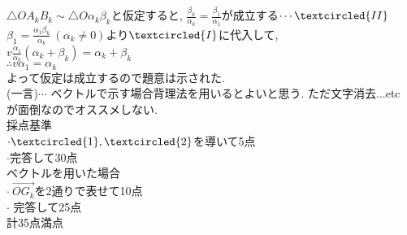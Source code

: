 \documentclass{article}
\begin{document}
$\triangle{OA_kB_k} \sim \triangle{O\alpha_k\beta_k}$と仮定すると,
$\frac{\beta_k}{\alpha_k}=\frac{\beta_1}{\alpha_1}$が成立する$\cdots \textcircled{II}$\vspace{0.1in}\\
$\beta_1=\frac{\alpha_1\beta_k}{\alpha_k}\ (\alpha_k\neq0)$より$\textcircled{I}$に代入して,\vspace{0.1in}\\
$v\frac{\alpha_1}{\alpha_k}(\alpha_k+\beta_k)=\alpha_k+\beta_k$\vspace{0.1in}\\
$\therefore v\alpha_1=\alpha_k$\vspace{0.1in}\\
よって仮定は成立するので題意は示された.\vspace{0.1in}\\
(一言)$\cdots$ ベクトルで示す場合背理法を用いるとよいと思う. ただ文字消去...etc\\
\hspace{0.62in}が面倒なのでオススメしない.\vspace{0.2in}\\
 {\Large 採点基準}\vspace{0.1in}\\
 $\cdot \textcircled{1}, \textcircled{2}$を導いて5点\vspace{0.2in}\\
 $\cdot$完答して30点\vspace{0.2in}\\
 ベクトルを用いた場合\vspace{0.2in}\\
 $\cdot\ \overrightarrow{OG_k}$を2通りで表せて10点\vspace{0.2in}\\
 $\cdot$ 完答して25点\vspace{0.2in}\\
 計35点満点
\end{document}
